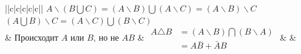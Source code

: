 \begin{tabu}[t]{||c|c|c|c|c||}
{		$\displaystyle A\backslash(B\bigcup C) = (A\backslash B)\bigcup(A\backslash C) = (A\backslash B)\backslash C $\\
		$\displaystyle (A\bigcup B)\backslash C = (A\backslash C)\bigcup(B\backslash C) $} \\
	\hline
		 &
		Происходит $A$ или $B$, но не $AB$ &
		$\displaystyle \begin{aligned}
			A\triangle B &= (A\backslash B) \bigcap (B\backslash A) \\
			&= A\bar{B} + \bar{A}B
		\end{aligned} $ &
		 &
		 \\
	\hline
\end{tabu}
